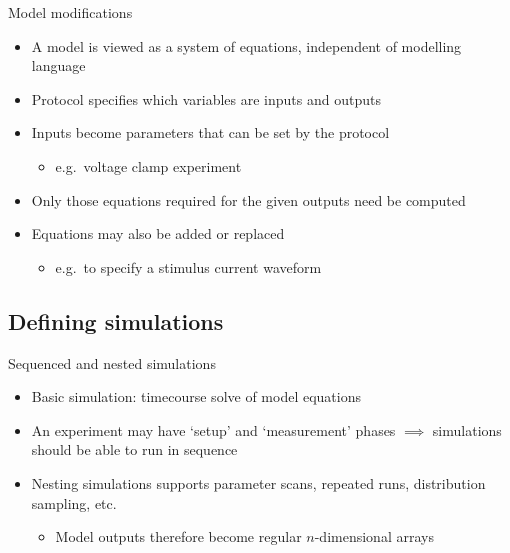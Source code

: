 \documentclass[t,xcolor={usenames,dvipsnames}]{beamer}
\newcommand{\subitem}[1]{\begin{itemize}[<.->]\item #1 \end{itemize}}
\begin{document}
\begin{frame}{Model modifications}
\begin{itemize}
\item A model is viewed as a \alert{system of equations}, independent of modelling language
\item<2-> Protocol specifies which variables are \alert{inputs} and \alert{outputs}
\item<2-> Inputs become parameters that can be set by the protocol
  \subitem{e.g.\ voltage clamp experiment}
\item<2-> Only those equations required for the given outputs need be computed
\item<3-> Equations may also be \alert{added or replaced}
  \subitem{e.g.\ to specify a stimulus current waveform}
\end{itemize}
\end{frame}


\subsection{Defining simulations}

\begin{frame}{Sequenced and nested simulations}
\begin{itemize}[<+->]
\item Basic simulation: timecourse solve of model equations
\item An experiment may have `setup' and `measurement' phases $\implies$ simulations should be able to run in sequence
\item \alert{Nesting} simulations supports parameter scans, repeated runs, distribution sampling, etc.
  \subitem{\alert{Model outputs therefore become regular $n$-dimensional arrays}}
\end{itemize}
\end{frame}
\end{document}
